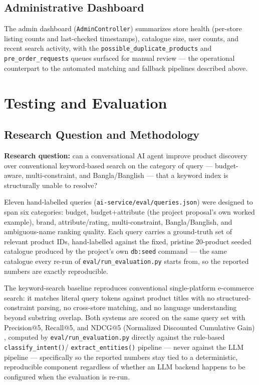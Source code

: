 \documentclass[12pt,a4paper]{report}
\begin{document}
\section{Administrative Dashboard}
The admin dashboard (\texttt{AdminController}) summarizes store health (per-store listing counts and
last-checked timestamps), catalogue size, user counts, and recent search activity, with the
\texttt{possible\_duplicate\_products} and \texttt{pre\_order\_requests} queues surfaced for manual review
--- the operational counterpart to the automated matching and fallback pipelines described above.

\chapter{Testing and Evaluation}

\section{Research Question and Methodology}
\textbf{Research question:} can a conversational AI agent improve product discovery over conventional
keyword-based search on the category of query --- budget-aware, multi-constraint, and Bangla/Banglish ---
that a keyword index is structurally unable to resolve?

Eleven hand-labelled queries (\texttt{ai-service/eval/queries.json}) were designed to span six categories:
budget, budget+attribute (the project proposal's own worked example), brand, attribute/rating,
multi-constraint, Bangla/Banglish, and ambiguous-name ranking quality. Each query carries a ground-truth
set of relevant product IDs, hand-labelled against the fixed, pristine 20-product seeded catalogue produced
by the project's own \texttt{db:seed} command --- the same catalogue every re-run of
\texttt{eval/run\_evaluation.py} starts from, so the reported numbers are exactly reproducible.

The keyword-search baseline reproduces conventional single-platform e-commerce search: it matches literal
query tokens against product titles with no structured-constraint parsing, no cross-store matching, and no
language understanding beyond substring overlap. Both systems are scored on the same query set with
Precision@5, Recall@5, and NDCG@5 (Normalized Discounted Cumulative Gain) \cite{jarvelin2002}, computed by
\texttt{eval/run\_evaluation.py} directly against the rule-based \texttt{classify\_intent()}/
\texttt{extract\_entities()} pipeline --- never against the LLM pipeline --- specifically so the reported
numbers stay tied to a deterministic, reproducible component regardless of whether an LLM backend happens
to be configured when the evaluation is re-run.
\end{document}
